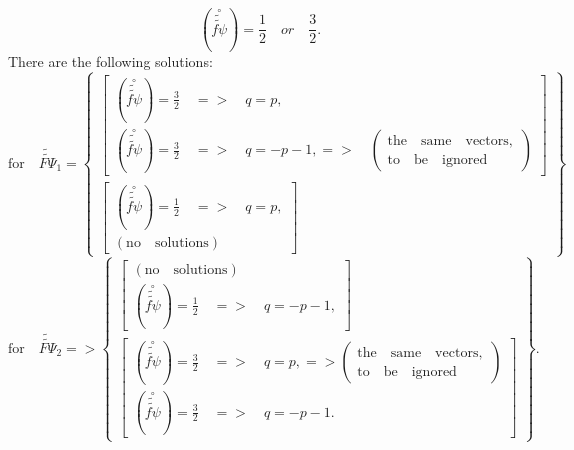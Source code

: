 \documentclass{article}
\begin{document}
\begin{equation*}
\left( \overset{\circ }{\widetilde{\widetilde{f\psi }}}\right) =\frac{1}{2}%
\quad or\quad \frac{3}{2}.
\end{equation*}
There are the following solutions:
\begin{equation*}
\mathrm{for}\quad \widetilde{\widetilde{F\Psi }}_{1}=\left\{
\begin{array}{c}
\left[
\begin{array}{c}
\left( \overset{\circ }{\widetilde{\widetilde{f\psi }}}\right) =\frac{3}{2}%
\quad =>\quad q=p, \\
\left( \overset{\circ }{\widetilde{\widetilde{f\psi }}}\right) =\frac{3}{2}%
\quad =>\quad q=-p-1,=>\quad \left(
\begin{array}{c}
\mathrm{the\quad same\quad vectors,} \\
\mathrm{to\quad be\quad ignored}
\end{array}
\right)
\end{array}
\right]  \\
\left[
\begin{array}{c}
\left( \overset{\circ }{\widetilde{\widetilde{f\psi }}}\right) =\frac{1}{2}%
\quad =>\quad q=p, \\
\left( \mathrm{no\quad solutions}\right)
\end{array}
\right]
\end{array}
\right\}
\end{equation*}
\begin{equation*}
\mathrm{for}\quad \widetilde{\widetilde{F\Psi }}_{2}=>\left\{
\begin{array}{c}
\left[
\begin{array}{c}
\left( \mathrm{no\quad solutions}\right)  \\
\left( \overset{\circ }{\widetilde{\widetilde{f\psi }}}\right) =\frac{1}{2}%
\quad =>\quad q=-p-1,
\end{array}
\right]  \\
\left[
\begin{array}{c}
\left( \overset{\circ }{\widetilde{\widetilde{f\psi }}}\right) =\frac{3}{2}%
\quad =>\quad q=p,=>\left(
\begin{array}{c}
\mathrm{the\quad same\quad vectors,} \\
\mathrm{to\quad be\quad ignored}
\end{array}
\right)  \\
\left( \overset{\circ }{\widetilde{\widetilde{f\psi }}}\right) =\frac{3}{2}%
\quad =>\quad q=-p-1.
\end{array}
\right]
\end{array}
\right\} .
\end{equation*}
\end{document}
